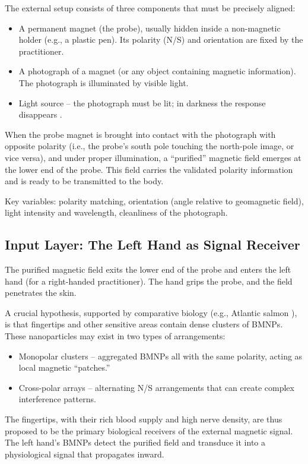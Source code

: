 \documentclass[12pt,a4paper]{article}
\begin{document}
The external setup consists of three components that must be precisely aligned:
\begin{itemize}
    \item A permanent magnet (the probe), usually hidden inside a non-magnetic holder (e.g., a plastic pen). Its polarity (N/S) and orientation are fixed by the practitioner.
    \item A photograph of a magnet (or any object containing magnetic information). The photograph is illuminated by visible light.
    \item Light source – the photograph must be lit; in darkness the response disappears \citep{hu2024optical}.
\end{itemize}

When the probe magnet is brought into contact with the photograph with opposite polarity (i.e., the probe's south pole touching the north-pole image, or vice versa), and under proper illumination, a ``purified'' magnetic field emerges at the lower end of the probe. This field carries the validated polarity information and is ready to be transmitted to the body.

Key variables: polarity matching, orientation (angle relative to geomagnetic field), light intensity and wavelength, cleanliness of the photograph.

\subsection{Input Layer: The Left Hand as Signal Receiver}

The purified magnetic field exits the lower end of the probe and enters the left hand (for a right-handed practitioner). The hand grips the probe, and the field penetrates the skin.

A crucial hypothesis, supported by comparative biology (e.g., Atlantic salmon \citep{johnson2023magnetic}), is that fingertips and other sensitive areas contain dense clusters of BMNPs. These nanoparticles may exist in two types of arrangements:
\begin{itemize}
    \item Monopolar clusters – aggregated BMNPs all with the same polarity, acting as local magnetic ``patches.''
    \item Cross-polar arrays – alternating N/S arrangements that can create complex interference patterns.
\end{itemize}

The fingertips, with their rich blood supply and high nerve density, are thus proposed to be the primary biological receivers of the external magnetic signal. The left hand's BMNPs detect the purified field and transduce it into a physiological signal that propagates inward.
\end{document}
